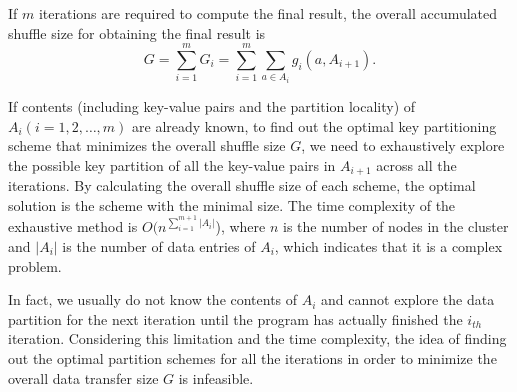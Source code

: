 \documentclass[10pt,journal,compsoc]{IEEEtran}
\newcommand{\red}[1]{\textcolor{red}{#1}}
\begin{document}

If $m$ iterations are required to compute the final result, 
the overall accumulated shuffle size for obtaining the final result is
\begin{equation}\label{eq:g}
G=\sum_{i=1}^{m} G_i=\sum_{i=1}^{m} \sum_{a \in A_i} g_i(a,A_{i+1}).
\end{equation}



If contents (including key-value pairs and the partition locality) of
$A_i (i=1,2,\ldots,m)$ are already known, to find out the optimal key partitioning scheme that minimizes 
the overall shuffle size $G$,  %
we need to exhaustively explore the possible key partition of all the key-value pairs in $A_{i+1}$ across all the iterations. 
By calculating the overall shuffle size of each scheme, the optimal solution is the scheme with the minimal size. 
The time complexity of the exhaustive method is $O(n^{\sum_{i=1}^{m+1} |A_i|}$), 
where $n$ is the number of nodes in the cluster and $|A_i|$ is the number of data entries of $A_i$, 
which indicates that it is a complex problem. 

In fact, we usually do not know the contents of $A_i$ and cannot explore the data partition
for the next iteration until the program has actually finished the $i_{th}$ iteration. 
Considering this limitation and the time complexity, the idea of finding
out the optimal partition schemes for all the iterations in order to
minimize the overall data transfer size $G$ is infeasible.
\end{document}

